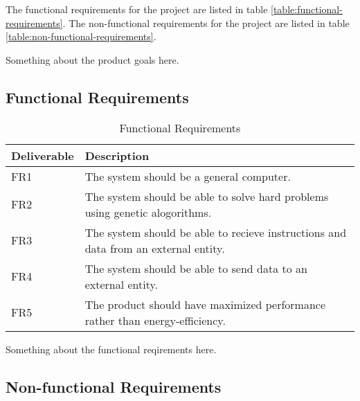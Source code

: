 
The functional requirements for the project are listed in table \vref{table:functional-requirements}.
\bigskip %
\bigskip %
\bigskip %
\bigskip %
\bigskip %
\bigskip %
\bigskip %
\bigskip %
\bigskip %
The non-functional requirements for the project are listed in table \vref{table:non-functional-requirements}.


Something about the product goals here.


 \subsection{Functional Requirements}

 \begin{table}
 \begin{center}
 \begin{tabular}{| l | l |}
 \hline
 Deliverable & Description \\
 \hline
 FR1 & The system should be a general computer.\\
 FR2 & The system should be able to solve hard problems using genetic alogorithms.\\
 FR3 & The system should be able to recieve instructions and data from an external entity.\\
 FR4 & The system should be able to send data to an external entity.\\
 FR5 & The product should have maximized performance rather than energy-efficiency. \\
 \hline
 \end{tabular}
 \caption{Functional Requirements}
 \label{table:functional-requirements}
 \end{center}
 \end{table}

 Something about the functional reqirements here.

 \subsection{Non-functional Requirements}

